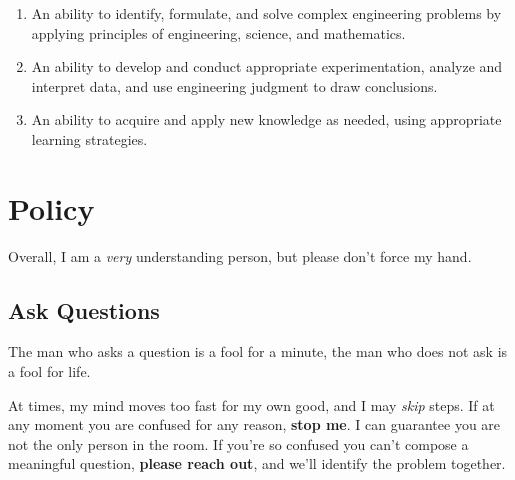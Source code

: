 \documentclass{article}
\begin{document}
\begin{enumerate}
	\slshape

	\item
		An ability to identify, formulate, and solve complex
		engineering problems by applying principles of
		engineering, science, and mathematics.

	\setcounter{enumi}{5}

	\item
		An ability to develop and conduct appropriate
		experimentation, analyze and interpret data, and use
		engineering judgment to draw conclusions.

	\item
		An ability to acquire and apply new knowledge as needed,
		using appropriate learning strategies.
\end{enumerate}

\section{Policy}

Overall, I am a \emph{very} understanding person, but please don't force
my hand.

\subsection{Ask Questions}

\begin{displayquote}[Confucius]
	The man who asks a question is a fool for a minute, the man who
	does not ask is a fool for life.
\end{displayquote}

\noindent
At times, my mind moves too fast for my own good, and I may \emph{skip}
steps.  If at any moment you are confused for any reason, \textbf{stop
me}.  I can guarantee you are not the only person in the room.  If
you're so confused you can't compose a meaningful question,
\textbf{please reach out}, and we'll identify the problem together.
\end{document}
